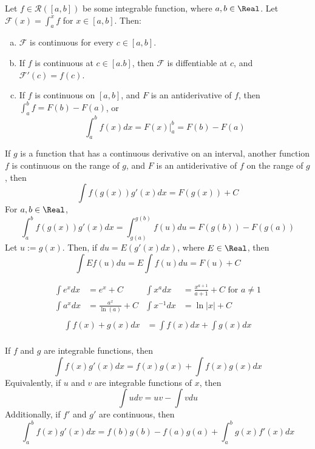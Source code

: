 \begin{theorem}
  Let $f \in \mathcal{R}([a, b])$ be some integrable function, where $a, b \in \Real$. Let $\mathcal{F}(x) = \int_a^x f$ for $x \in [a, b]$. Then:
  \begin{enumerate}[(a)]
    \item $\mathcal{F}$ is continuous for every $c \in [a, b]$.
    \item If $f$ is continuous at $c \in [a. b]$, then $\mathcal{F}$ is diffentiable at $c$, and $\mathcal{F}'(c) = f(c)$.
    \item If $f$ is continuous on $[a, b]$, and $F$ is an antiderivative of $f$, then $\int_a^b f = F(b) - F(a)$, or
      \[
        \int_a^b f(x) dx = F(x) \bigg\rvert_a^b = F(b) - F(a)
      \]
  \end{enumerate}
\end{theorem}

\begin{theorem}
  If $g$ is a function that has a continuous derivative on an interval, another function $f$ is continuous on the range of $g$, and $F$ is an antiderivative of $f$ on the range of $g$, then
  \[
    \int f(g(x)) g'(x) dx = F(g(x)) + C
  \]
  For $a, b \in \Real$,
  \[
    \int_a^b f(g(x))g'(x)dx = \int_{g(a)}^{g(b)} f(u) du = F(g(b)) - F(g(a))
  \]
  Let $u := g(x)$. Then, if $du = E (g'(x) dx)$, where $E \in \Real$, then 
  \[
    \int E f(u) du = E \int f(u) du = F(u) + C
  \]
\end{theorem}

\begin{theorem}
  \[\begin{aligned}
    \int e^x dx &= e^x + C & \int x^a dx &= \frac{x^{a + 1}}{a + 1} + C \text{ for } a \neq 1 \\
    \int a^x dx &= \frac{a^x}{\ln(a)} + C & \int x^{-1} dx &= \ln |x| + C \\
  \end{aligned}\]\[\begin{aligned}
    \int f(x) + g(x) dx &= \int f(x) dx + \int g(x) dx \\
  \end{aligned}\]
\end{theorem}

\begin{theorem}
  If $f$ and $g$ are integrable functions, then
  \[
    \int f(x) g'(x) dx = f(x) g(x) + \int f(x) g(x) dx
  \]
  Equivalently, if $u$ and $v$ are integrable functions of $x$, then
  \[
    \int udv = uv - \int vdu
  \]
  Additionally, if $f'$ and $g'$ are continuous, then
  \[
    \int_a^b f(x) g'(x) dx = f(b)g(b) - f(a)g(a) + \int_a^b g(x) f'(x) dx
  \]
\end{theorem}

